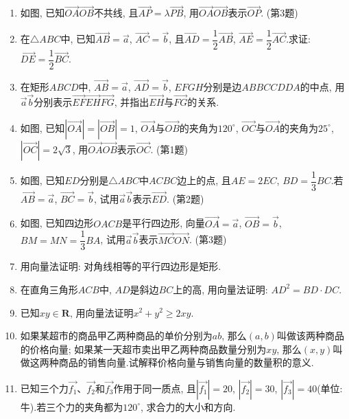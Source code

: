 \documentclass[10pt,a4paper]{article}
\begin{document}
\begin{enumerate}[1.]
\item 如图, 已知$\overrightarrow{OA}\overrightarrow{OB}$不共线, 且$\overrightarrow{AP}=\lambda \overrightarrow{PB}$, 用$\overrightarrow{OA}\overrightarrow{OB}$表示$\overrightarrow{OP}$.
(第3题)
\item 在$\triangle ABC$中, 已知$\overrightarrow{AB}=\overrightarrow a$, $\overrightarrow{AC}=\overrightarrow b$, 且$\overrightarrow{AD}=\dfrac 12\overrightarrow{AB}$, $\overrightarrow{AE}=\dfrac 12\overrightarrow{AC}$.求证: $\overrightarrow{DE}=\dfrac 12\overrightarrow{BC}$.
\item 在矩形$ABCD$中, $\overrightarrow{AB}=\overrightarrow a$, $\overrightarrow{AD}=\overrightarrow b$, $EFGH$分别是边$ABBCCDDA$的中点, 用$\overrightarrow a\overrightarrow b$分别表示$\overrightarrow{EF}\overrightarrow{EH}\overrightarrow{FG}$, 并指出$\overrightarrow{EH}$与$\overrightarrow{FG}$的关系.
\item 如图, 已知$|\overrightarrow{OA}|=|\overrightarrow{OB}|=1$, $\overrightarrow{OA}$与$\overrightarrow{OB}$的夹角为$120^{\circ }$, $\overrightarrow{OC}$与$\overrightarrow{OA}$的夹角为$25^{\circ }$, $|\overrightarrow{OC}|=2\sqrt 3$, 用$\overrightarrow{OA}\overrightarrow{OB}$表示$\overrightarrow{OC}$.
(第1题)
\item 如图, 已知$ED$分别是$\triangle ABC$中$ACBC$边上的点, 且$AE=2EC$, $BD=\dfrac 13BC$.若$\overrightarrow{AB}=\overrightarrow a$, $\overrightarrow{BC}=\overrightarrow b$, 试用$\overrightarrow a\overrightarrow b$表示$\overrightarrow{ED}$.
(第2题)
\item 如图, 已知四边形$OACB$是平行四边形, 向量$\overrightarrow{OA}=\overrightarrow a$, $\overrightarrow{OB}=\overrightarrow b$, $BM=MN=\dfrac 13BA$, 试用$\overrightarrow a\overrightarrow b$表示$\overrightarrow{MC}\overrightarrow{ON}$.
(第3题)
\item 用向量法证明: 对角线相等的平行四边形是矩形.
\item 在直角三角形$ACB$中, $AD$是斜边$BC$上的高, 用向量法证明: $AD^2=BD\cdot DC$.
\item 已知$xy\in \mathbf{R}$, 用向量法证明$x^2+y^2\ge 2xy$.
\item 如果某超市的商品甲乙两种商品的单价分别为$ab$, 那么$(a,b)$叫做该两种商品的价格向量; 如果某一天超市卖出甲乙两种商品数量分别为$xy$, 那么$(x,y)$叫做这两种商品的销售向量.试解释价格向量与销售向量的数量积的意义.
\item 已知三个力$\overrightarrow{f_1}$、$\overrightarrow{f_2}$和$\overrightarrow{f_3}$作用于同一质点, 且$|\overrightarrow{f_1}|=20$, $|\overrightarrow{f_2}|=30$, $|\overrightarrow{f_3}|=40$(单位: 牛).若三个力的夹角都为$120^{\circ }$, 求合力的大小和方向.

\end{enumerate}
\end{document}
